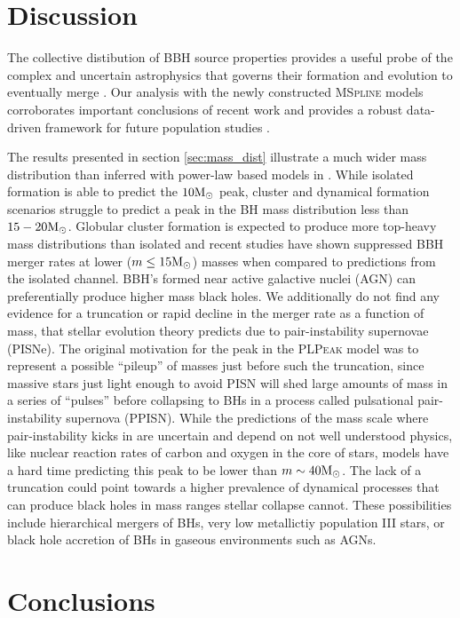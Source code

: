 \section{Discussion}\label{sec:astrodiscussion}

The collective distibution of BBH source properties provides a useful probe of the complex and uncertain astrophysics that governs their 
formation and evolution to eventually merge . Our analysis with the newly constructed \textsc{MSpline} models corroborates important 
conclusions of recent work and provides a robust data-driven framework for future population studies . 

The results presented in section \ref{sec:mass_dist} illustrate a much wider mass distribution than inferred with power-law based models in \citet{o3b_astro_dist}. 
While isolated formation is able to predict the $10{\rm M}_\odot$ peak, cluster and dynamical formation scenarios struggle to predict a peak in the BH mass distribution less than 
$15-20{\rm M}_\odot$. Globular cluster formation is expected to produce more top-heavy mass distributions than isolated and recent studies have shown suppressed BBH merger rates 
at lower ($m\leq15{\rm M}_\odot$) masses when compared to predictions from the isolated channel. BBH's formed near active galactive nuclei (AGN) can preferentially produce higher 
mass black holes. We additionally do not find any evidence for a truncation or rapid decline in the merger rate as a function of mass, that stellar evolution theory predicts 
due to pair-instability supernovae (PISNe). The original motivation for the peak in the \textsc{PLPeak} model was to represent a possible ``pileup'' of masses just before such the 
truncation, since massive stars just light enough to avoid PISN will shed large amounts of mass in a series of ``pulses'' before collapsing to BHs in a process called 
pulsational pair-instability supernova (PPISN). While the predictions of the mass scale where pair-instability kicks in are uncertain and depend on not well understood physics, 
like nuclear reaction rates of carbon and oxygen in the core of stars, models have a hard time predicting this peak to be lower than $m\sim40{\rm M}_\odot$. The lack of a truncation could 
point towards a higher prevalence of dynamical processes that can produce black holes in mass ranges stellar collapse cannot. These possibilities include hierarchical mergers of BHs, 
very low metallictiy population III stars, or black hole accretion of BHs in gaseous environments such as AGNs. 




\section{Conclusions}\label{sec:conclusion}

